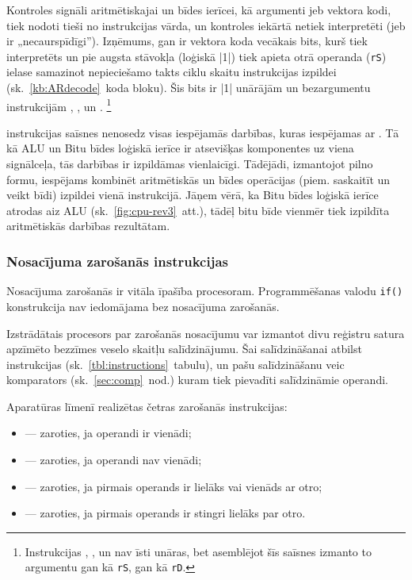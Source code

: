 	Kontroles signāli aritmētiskajai un bīdes ierīcei,
	kā argumenti jeb vektora kodi,
	tiek nodoti tieši no instrukcijas vārda, un kontroles iekārtā netiek
	interpretēti (jeb ir „necaurspīdīgi”). Izņēmums, gan ir vektora koda
	vecākais bits, kurš tiek interpretēts un pie augsta stāvokļa (loģiskā |1|)
	tiek apieta otrā operanda (\texttt{rS}) ielase samazinot nepieciešamo
	takts ciklu skaitu instrukcijas izpildei (sk.~\ref{kb:ARdecode}~koda bloku).
	Šis bits ir |1|	unārājām un bezargumentu instrukcijām
	, ,  un .%
	\footnote{Instrukcijas , ,  un 
		nav īsti unāras, bet asemblējot šīs saīsnes izmanto to argumentu gan kā
		\texttt{rS}, gan kā \texttt{rD}.}
	
	\begin{singlespace}
		VHDL},%
		                caption={\mnem{AR} instrukcijas dekodēšana (izgriezums).},%
		                label=kb:ARdecode,%
		                firstnumber=150]
			{code/gen/ardecode-snippet.vhd}
	\end{singlespace}
	
	 instrukcijas saīsnes nenosedz visas iespējamās darbības, kuras
	iespējamas ar . Tā kā ALU un Bitu bīdes loģiskā ierīce ir
	atsevišķas komponentes uz viena signālceļa, tās darbības ir izpildāmas
	vienlaicīgi. Tādējādi, izmantojot  pilno formu, iespējams
	kombinēt aritmētiskās un bīdes operācijas (piem. saskaitīt un veikt bīdi)
	izpildei vienā instrukcijā. Jāņem vērā, ka Bitu bīdes loģiskā ierīce
	atrodas aiz ALU (sk.~\ref{fig:cpu-rev3}~att.),
	tādēļ bitu bīde vienmēr tiek izpildīta aritmētiskās darbības rezultātam.


\subsubsection{Nosacījuma zarošanās instrukcijas} \label{sec:branching}
	Nosacījuma zarošanās ir vitāla īpašība procesoram. Programmēšanas
	valodu \texttt{if()} konstrukcija nav iedomājama bez
	nosacījuma zarošanās.
	
	Izstrādātais procesors par zarošanās nosacījumu var izmantot divu reģistru
	satura apzīmēto bezzīmes veselo skaitļu salīdzinājumu.
	Šai salīdzināšanai atbilst  instrukcijas
	(sk.~\ref{tbl:instructions}~tabulu), un pašu salīdzināšanu veic komparators
	(sk.~\ref{sec:comp}~nod.) kuram tiek pievadīti salīdzināmie operandi.
	
	\pagebreak[2]
	Aparatūras līmenī realizētas četras zarošanās instrukcijas:
	\begin{itemize}
		\item {} — zaroties, ja operandi ir vienādi;
		\item {} — zaroties, ja operandi nav vienādi;
		\item {} — zaroties, ja pirmais operands ir lielāks
			vai vienāds ar otro;
		\item {} — zaroties, ja pirmais operands ir stingri lielāks
			par otro.
	\end{itemize}
	
